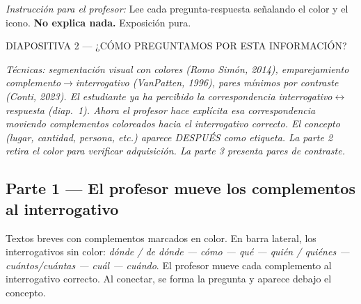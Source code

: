 \documentclass[a4paper,10pt]{article}
\newcommand{\diapheader}[2]{%
  \noindent\begin{tcolorbox}[
    colback=naranja,
    colframe=naranja,
    coltext=white,
    fontupper=\bfseries\large,
    boxrule=0pt,
    arc=3pt,
    left=6pt, right=6pt, top=4pt, bottom=4pt
  ]
  DIAPOSITIVA #1 — #2
  \end{tcolorbox}
}
\begin{document}
\vspace{0.3cm}

\begin{tcolorbox}[colback=gris, colframe=grismedio, boxrule=0.5pt, arc=2pt]
\textit{Instrucción para el profesor:} Lee cada pregunta-respuesta señalando el color y el icono. \textbf{No explica nada.} Exposición pura.
\end{tcolorbox}

\newpage


\diapheader{2}{¿CÓMO PREGUNTAMOS POR ESTA INFORMACIÓN?}

\vspace{0.2cm}

\begin{marsbox}
\textit{Técnicas: segmentación visual con colores (Romo Simón, 2014), emparejamiento complemento$\to$interrogativo (VanPatten, 1996), pares mínimos por contraste (Conti, 2023). El estudiante ya ha percibido la correspondencia interrogativo$\leftrightarrow$respuesta (diap.~1). Ahora el profesor hace explícita esa correspondencia moviendo complementos coloreados hacia el interrogativo correcto. El concepto (lugar, cantidad, persona, etc.) aparece DESPUÉS como etiqueta. La parte 2 retira el color para verificar adquisición. La parte 3 presenta pares de contraste.}
\end{marsbox}

\vspace{0.3cm}

\subsection*{\textcolor{naranja}{Parte 1 --- El profesor mueve los complementos al interrogativo}}

{\small Textos breves con complementos marcados en color. En barra lateral, los interrogativos sin color: \textit{dónde / de dónde --- cómo --- qué --- quién / quiénes --- cuántos/cuántas --- cuál --- cuándo}. El profesor mueve cada complemento al interrogativo correcto. Al conectar, se forma la pregunta y aparece debajo el concepto.}

\vspace{0.2cm}
\end{document}
